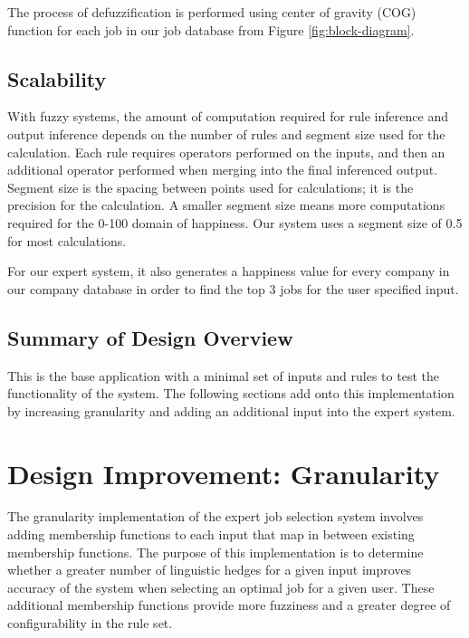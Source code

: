 \documentclass[12pt,fleqn,reqno,letterpaper]{article}
\begin{document}
The process of defuzzification is performed using center of gravity (COG) function for each job in our job database from Figure \ref{fig:block-diagram}.

\subsection{Scalability}
With fuzzy systems, the amount of computation required for rule inference and output inference depends on the number of rules and segment size used for the calculation. Each rule requires operators performed on the inputs, and then an additional operator performed when merging into the final inferenced output. Segment size is the spacing between points used for calculations; it is the precision for the calculation. A smaller segment size means more computations required for the 0-100 domain of happiness. Our system uses a segment size of 0.5 for most calculations.

For our expert system, it also generates a happiness value for every company in our company database in order to find the top 3 jobs for the user specified input.

\subsection{Summary of Design Overview}
This is the base application with a minimal set of inputs and rules to test the functionality of the system. The following sections add onto this implementation by increasing granularity and adding an additional input into the expert system.

\section{Design Improvement: Granularity}
The granularity implementation of the expert job selection system involves adding membership functions to each input that map in between existing membership functions.  The purpose of this implementation is to determine whether a greater number of linguistic hedges for a given input improves accuracy of the system when selecting an optimal job for a given user.  These additional membership functions provide more fuzziness and a greater degree of configurability in the rule set.
\end{document}
